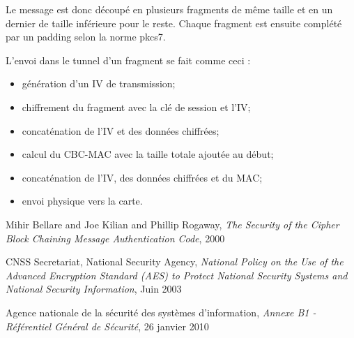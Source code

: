 \documentclass[a4paper,11pt,french]{article}
\begin{document}
Le message est donc découpé en plusieurs fragments de même taille et en un dernier de taille inférieure pour le reste. Chaque fragment est ensuite complété par un padding selon la norme pkcs7.


L'envoi dans le tunnel d'un fragment se fait comme ceci : 
\begin{itemize}
    \item génération d'un IV de transmission;
    \item chiffrement du fragment avec la clé de session et l'IV;
    \item concaténation de l'IV et des données chiffrées;
    \item calcul du CBC-MAC avec la taille totale ajoutée au début;
    \item concaténation de l'IV, des données chiffrées et du MAC;
    \item envoi physique vers la carte.
\end{itemize} 

\begin{thebibliography}{9}


    Mihir Bellare and Joe Kilian and Phillip Rogaway,
  \emph{The Security of the Cipher Block Chaining Message Authentication Code},
    2000

CNSS Secretariat, National Security Agency,
\emph{National Policy on the Use of the Advanced Encryption Standard (AES) to 
Protect National Security Systems and National Security Information},
Juin 2003

Agence nationale de la sécurité des systèmes d’information,
\emph{Annexe B1 - Référentiel Général de Sécurité}, 26 janvier 2010
\end{thebibliography}
\end{document}
